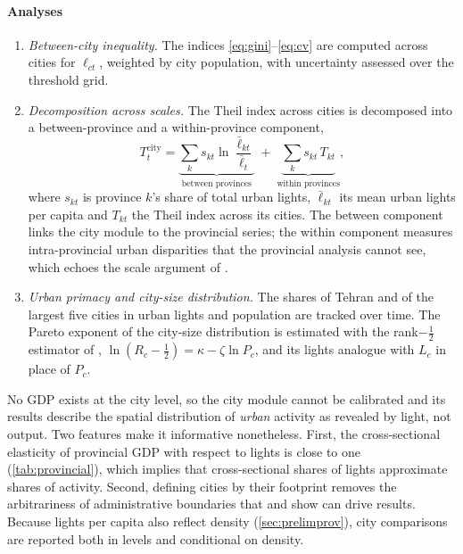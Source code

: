 \documentclass[11pt,a4paper]{article}
\begin{document}
\paragraph{Analyses}
\begin{enumerate}[label=(\alph*)]
\item \emph{Between-city inequality.} The indices \eqref{eq:gini}--\eqref{eq:cv} are computed across cities for $\ell_{ct}$, weighted by city population, with uncertainty assessed over the threshold grid.
\item \emph{Decomposition across scales.} The Theil index across cities is decomposed into a between-province and a within-province component,
\begin{equation}
T^{\text{city}}_t = \underbrace{\sum_{k} s_{kt}\ln\frac{\bar\ell_{kt}}{\bar\ell_t}}_{\text{between provinces}} \;+\; \underbrace{\sum_{k} s_{kt}\,T_{kt}}_{\text{within provinces}},
\label{eq:decomp}
\end{equation}
where $s_{kt}$ is province $k$'s share of total urban lights, $\bar\ell_{kt}$ its mean urban lights per capita and $T_{kt}$ the Theil index across its cities. The between component links the city module to the provincial series; the within component measures intra-provincial urban disparities that the provincial analysis cannot see, which echoes the scale argument of \citet{LeeBreau2026}.
\item \emph{Urban primacy and city-size distribution.} The shares of Tehran and of the largest five cities in urban lights and population are tracked over time. The Pareto exponent of the city-size distribution is estimated with the rank$-\frac12$ estimator of \citet{GabaixIbragimov2011}, $\ln(R_c-\tfrac12)=\kappa-\zeta\ln P_c$, and its lights analogue with $L_c$ in place of $P_c$.
\end{enumerate}

\begin{notebox}[title={Interpretation of city-level results}]
No GDP exists at the city level, so the city module cannot be calibrated and its results describe the spatial distribution of \emph{urban} activity as revealed by light, not output. Two features make it informative nonetheless. First, the cross-sectional elasticity of provincial GDP with respect to lights is close to one (\cref{tab:provincial}), which implies that cross-sectional shares of lights approximate shares of activity. Second, defining cities by their footprint removes the arbitrariness of administrative boundaries that \citet{Magrini2004} and \citet{Dingel2021} show can drive results. Because lights per capita also reflect density (\cref{sec:prelimprov}), city comparisons are reported both in levels and conditional on density.
\end{notebox}
\end{document}
